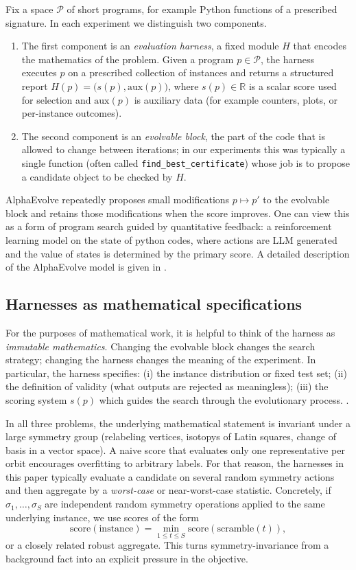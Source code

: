 \documentclass[11pt]{amsart}
\begin{document}
Fix a space $\mathcal{P}$ of short programs, for example Python functions of a prescribed signature.
In each experiment we distinguish two components.
\begin{enumerate}
    \item The first component is an \emph{evaluation harness}, a fixed module $H$ that encodes the mathematics of the problem.
Given a program $p\in\mathcal{P}$, the harness executes $p$ on a prescribed collection of instances and returns a structured report $H(p)=\bigl(s(p),\mathrm{aux}(p)\bigr)$,
where $s(p)\in\mathbb{R}$ is a scalar score used for selection and $\mathrm{aux}(p)$ is auxiliary data (for example counters, plots, or per-instance outcomes).
\item The second component is an \emph{evolvable block}, the part of the code that is allowed to change between iterations; in our experiments this was typically a single function (often called \texttt{find\_best\_certificate}) whose job is to propose a candidate object to be checked by $H$.
\end{enumerate}

AlphaEvolve repeatedly proposes small modifications $p\mapsto p'$ to the evolvable block and retains those modifications when the score improves.
One can view this as a form of program search guided by quantitative feedback: a reinforcement learning model on the state of python codes, where actions are LLM generated and the value of states is determined by the primary score. 
A detailed description of the AlphaEvolve model is given in \cite{AlphaEvolveArxiv,DeepMindAlphaEvolve2025,GeorgievGomezSerranoTaoWagner2025}.

\subsection{Harnesses as mathematical specifications}
For the purposes of mathematical work, it is helpful to think of the harness as \emph{immutable mathematics}.
Changing the evolvable block changes the search strategy; changing the harness changes the meaning of the experiment.
In particular, the harness specifies:
(i) the instance distribution or fixed test set;
(ii) the definition of validity (what outputs are rejected as meaningless);
(iii) the scoring system $s(p)$ which guides the search through the evolutionary process. .

In all three problems, the underlying mathematical statement is invariant under a large symmetry group (relabeling vertices, isotopys of Latin squares, change of basis in a vector space).
A naive score that evaluates only one representative per orbit encourages overfitting to arbitrary labels.
For that reason, the harnesses in this paper typically evaluate a candidate on several random symmetry actions and then aggregate by a \emph{worst-case} or near-worst-case statistic.
Concretely, if $\sigma_1,\dots,\sigma_S$ are independent random symmetry operations applied to the same underlying instance, we use scores of the form
\[
\mathrm{score}(\text{instance}) = \min_{1\le t\le S}  \mathrm{score}(\text{scramble}(t)),
\]
or a closely related robust aggregate.
This turns symmetry-invariance from a background fact into an explicit pressure in the objective.
\end{document}
